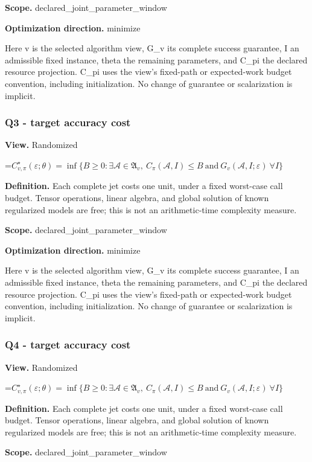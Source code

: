 \documentclass[10pt,a4paper]{article}
\newcommand{\AtlasMath}[1]{\par\begingroup\centering\setbox0=\hbox{$\displaystyle #1$}\ifdim\wd0>1.4\linewidth\typeout{ATLAS WIDE FORMULA: \the\wd0}\fi\ifdim\wd0>\linewidth\resizebox{\linewidth}{!}{\box0}\else\box0\fi\par\endgroup}
\begin{document}
\textbf{Scope.} declared\_joint\_parameter\_window

\textbf{Optimization direction.} minimize

Here v is the selected algorithm view, G\_v its complete success guarantee, I an admissible fixed instance, theta the remaining parameters, and C\_pi the declared resource projection. C\_pi uses the view's fixed-path or expected-work budget convention, including initialization. No change of guarantee or scalarization is implicit.

\subsubsection{Q3 - target accuracy cost}
\textbf{View.} Randomized

\AtlasMath{C^\star_{v,\pi}(\varepsilon;\theta)=\inf\{B\ge0:\exists\mathcal A\in\mathfrak A_v,\ C_\pi(\mathcal A,I)\le B\ \text{and}\ G_v(\mathcal A,I;\varepsilon)\ \forall I\}}
\textbf{Definition.} Each complete jet costs one unit, under a fixed worst-case call budget. Tensor operations, linear algebra, and global solution of known regularized models are free; this is not an arithmetic-time complexity measure.

\textbf{Scope.} declared\_joint\_parameter\_window

\textbf{Optimization direction.} minimize

Here v is the selected algorithm view, G\_v its complete success guarantee, I an admissible fixed instance, theta the remaining parameters, and C\_pi the declared resource projection. C\_pi uses the view's fixed-path or expected-work budget convention, including initialization. No change of guarantee or scalarization is implicit.

\subsubsection{Q4 - target accuracy cost}
\textbf{View.} Randomized

\AtlasMath{C^\star_{v,\pi}(\varepsilon;\theta)=\inf\{B\ge0:\exists\mathcal A\in\mathfrak A_v,\ C_\pi(\mathcal A,I)\le B\ \text{and}\ G_v(\mathcal A,I;\varepsilon)\ \forall I\}}
\textbf{Definition.} Each complete jet costs one unit, under a fixed worst-case call budget. Tensor operations, linear algebra, and global solution of known regularized models are free; this is not an arithmetic-time complexity measure.

\textbf{Scope.} declared\_joint\_parameter\_window
\end{document}
